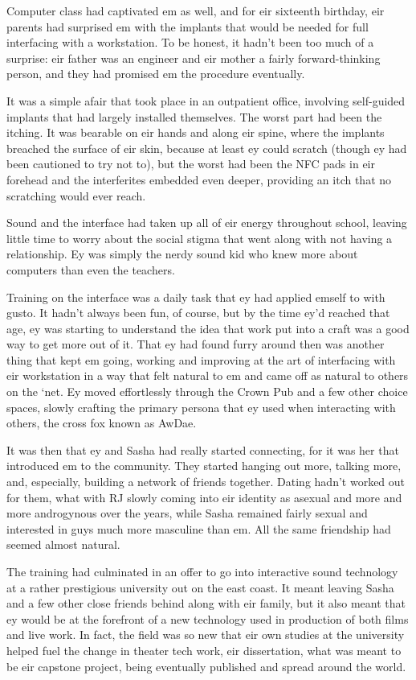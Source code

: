 Computer class had captivated em as well, and for eir sixteenth birthday, eir parents had surprised em with the implants that would be needed for full interfacing with a workstation. To be honest, it hadn't been too much of a surprise: eir father was an engineer and eir mother a fairly forward-thinking person, and they had promised em the procedure eventually.

It was a simple afair that took place in an outpatient office, involving self-guided implants that had largely installed themselves. The worst part had been the itching. It was bearable on eir hands and along eir spine, where the implants breached the surface of eir skin, because at least ey could scratch (though ey had been cautioned to try not to), but the worst had been the NFC pads in eir forehead and the interferites embedded even deeper, providing an itch that no scratching would ever reach.

Sound and the interface had taken up all of eir energy throughout school, leaving little time to worry about the social stigma that went along with not having a relationship. Ey was simply the nerdy sound kid who knew more about computers than even the teachers.

Training on the interface was a daily task that ey had applied emself to with gusto. It hadn't always been fun, of course, but by the time ey'd reached that age, ey was starting to understand the idea that work put into a craft was a good way to get more out of it. That ey had found furry around then was another thing that kept em going, working and improving at the art of interfacing with eir workstation in a way that felt natural to em and came off as natural to others on the `net. Ey moved effortlessly through the Crown Pub and a few other choice spaces, slowly crafting the primary persona that ey used when interacting with others, the cross fox known as AwDae.

It was then that ey and Sasha had really started connecting, for it was her that introduced em to the community. They started hanging out more, talking more, and, especially, building a network of friends together. Dating hadn't worked out for them, what with RJ slowly coming into eir identity as asexual and more and more androgynous over the years, while Sasha remained fairly sexual and interested in guys much more masculine than em. All the same friendship had seemed almost natural.

The training had culminated in an offer to go into interactive sound technology at a rather prestigious university out on the east coast. It meant leaving Sasha and a few other close friends behind along with eir family, but it also meant that ey would be at the forefront of a new technology used in production of both films and live work. In fact, the field was so new that eir own studies at the university helped fuel the change in theater tech work, eir dissertation, what was meant to be eir capstone project, being eventually published and spread around the world.

